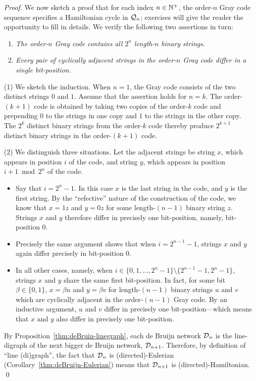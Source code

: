 \begin{proof}
We now sketch a proof that for each index $n \in \mathbb{N}^+$, the order-$n$
Gray code sequence specifies a Hamiltonian cycle in $\mbox{$\cal Q$}_n$; exercises
will give the reader the opportunity to fill in details.  We verify
the following two assertions in turn:
\begin{enumerate}
\item
{\it The order-$n$ Gray code contains all $2^n$ length-$n$ binary
  strings.}
\item
{\it Every pair of cyclically adjacent strings in the order-$n$ Gray
  code differ in a single bit-position.}
\end{enumerate}

(1) We sketch the induction.  When $n=1$, the Gray code consists of
the two distinct strings $0$ and $1$.  Assume that the assertion holds
for $n=k$.  The order-$(k+1)$ code is obtained by taking two copies of
the order-$k$ code and prepending $0$ to the strings in one copy and
$1$ to the strings in the other copy.  The $2^k$ distinct binary
strings from the order-$k$ code thereby produce $2^{k+1}$ distinct
binary strings in the order-$(k+1)$ code.

(2) We distinguish three situations.  Let the adjacent strings be
string $x$, which appears in position $i$ of the code, and string $y$,
which appears in position $i+1 \bmod 2^n$ of the code.
  \begin{itemize}
  \item
Say that $i = 2^n-1$.  In this case $x$ is the last string in the
code, and $y$ is the first string.  By the ``refective'' nature of the
construction of the code, we know that $x = 1z$ and $y = 0z$ for some
length-$(n-1)$ binary string $z$.  Strings $x$ and $y$ therefore
differ in precisely one bit-position, namely, bit-position $0$.

  \item
Precisely the same argument shows that when $i = 2^{n-1} -1$, strings
$x$ and $y$ again differ precisely in bit-position $0$.

  \item
In all other cases, namely, when $i \in \{0,1, \ldots, 2^n-1\}
\setminus \{2^{n-1} -1, 2^n-1\}$, strings $x$ and $y$ share the same
first bit-position.  In fact, for some bit $\beta \in \{0,1\}$, $x =
\beta u$ and $y = \beta v$ for length-$(n-1)$ binary strings $u$ and
$v$ which are cyclically adjacent in the order-$(n-1)$ Gray code.  By
an inductive argument, $u$ and $v$ differ in precisely one
bit-position---which means that $x$ and $y$ also differ in precisely
one bit-position.
  \end{itemize}

\medskip

By Proposition~\ref{thm:deBruin-linegraph}, each de Bruijn network
$\mbox{$\cal D$}_n$ is the line-digraph of the next bigger de Bruijn network,
$\mbox{$\cal D$}_{n+1}$.  Therefore, by definition of ``line (di)graph'', the fact
that $\mbox{$\cal D$}_n$ is (directed)-Eulerian
(Corollary~\ref{thm:deBruijn-Eulerian}) means that $\mbox{$\cal D$}_{n+1}$ is
(directed)-Hamiltonian.  \qed
\end{proof}


